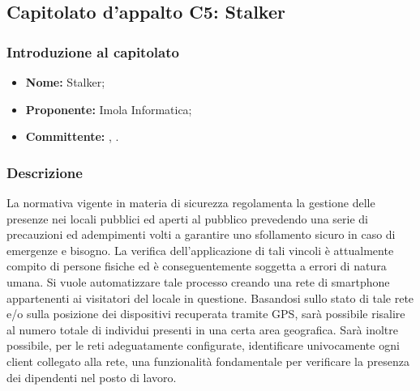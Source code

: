 \subsection{Capitolato d'appalto C5: Stalker}
	\subsubsection{Introduzione al capitolato}
	\begin{itemize}
		\item \textbf{Nome:} Stalker;
		\item \textbf{Proponente}\textbf{:} Imola Informatica;
		\item \textbf{Committente}\textbf{:} \TV, \RC.
	\end{itemize}
	
	\subsubsection{Descrizione}
	La normativa vigente in materia di sicurezza regolamenta la gestione delle presenze nei locali pubblici ed aperti al pubblico prevedendo una serie di precauzioni ed adempimenti volti a garantire uno sfollamento sicuro in caso di emergenze e bisogno. La verifica dell'applicazione di tali vincoli è attualmente compito di persone fisiche ed è conseguentemente soggetta a errori di natura umana.
	Si vuole automatizzare tale processo creando una rete di smartphone appartenenti ai visitatori del locale in questione. Basandosi sullo stato di tale rete e/o sulla posizione dei dispositivi recuperata tramite GPS, sarà possibile risalire al numero totale di individui presenti in una certa area geografica. Sarà inoltre possibile, per le reti adeguatamente configurate, identificare univocamente ogni client collegato alla rete, una funzionalità fondamentale per verificare la presenza dei dipendenti nel posto di lavoro.
	
